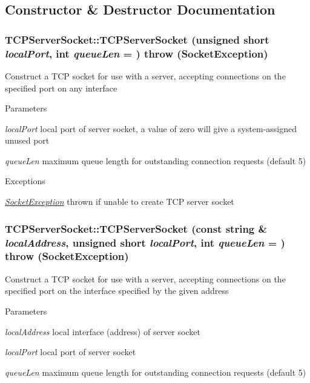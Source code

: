 \subsection{Constructor \& Destructor Documentation}
\hypertarget{classTCPServerSocket_ae559a3154527d09fe14a8e5ee1f53d7a}{
\subsubsection[{TCPServerSocket}]{\setlength{\rightskip}{0pt plus 5cm}TCPServerSocket::TCPServerSocket (unsigned short {\em localPort}, \/  int {\em queueLen} = {})  throw ({\bf SocketException})}}
\label{classTCPServerSocket_ae559a3154527d09fe14a8e5ee1f53d7a}
Construct a TCP socket for use with a server, accepting connections on the specified port on any interface 
\begin{DoxyParams}{Parameters}
\item[{\em localPort}]local port of server socket, a value of zero will give a system-\/assigned unused port \item[{\em queueLen}]maximum queue length for outstanding connection requests (default 5) \end{DoxyParams}

\begin{DoxyExceptions}{Exceptions}
\item[{\em \hyperlink{classSocketException}{SocketException}}]thrown if unable to create TCP server socket \end{DoxyExceptions}
\hypertarget{classTCPServerSocket_a3908fecb1b038f7c14fcc7726f54d01d}{
\subsubsection[{TCPServerSocket}]{\setlength{\rightskip}{0pt plus 5cm}TCPServerSocket::TCPServerSocket (const string \& {\em localAddress}, \/  unsigned short {\em localPort}, \/  int {\em queueLen} = {})  throw ({\bf SocketException})}}
\label{classTCPServerSocket_a3908fecb1b038f7c14fcc7726f54d01d}
Construct a TCP socket for use with a server, accepting connections on the specified port on the interface specified by the given address 
\begin{DoxyParams}{Parameters}
\item[{\em localAddress}]local interface (address) of server socket \item[{\em localPort}]local port of server socket \item[{\em queueLen}]maximum queue length for outstanding connection requests (default 5) \end{DoxyParams}

